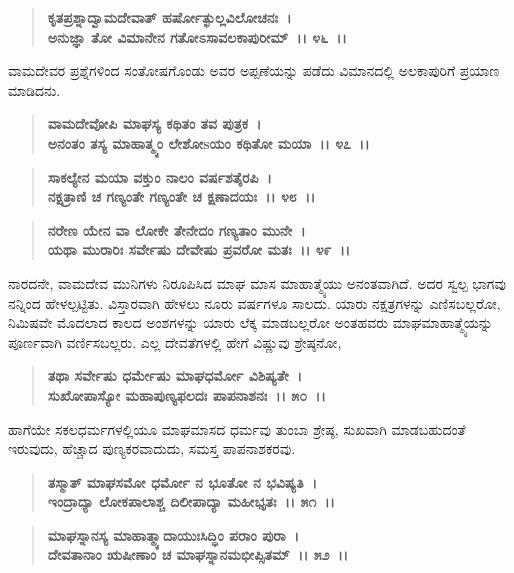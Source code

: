 \begin{verse}
\textbf{ಕೃತಪ್ರಶ್ನಾದ್ವಾಮದೇವಾತ್ ಹರ್ಷೋತ್ಫುಲ್ಲವಿಲೋಚನಃ~।}\\\textbf{ಅನುಜ್ಞಾ ತೋ ವಿಮಾನೇನ ಗತೋಽಸಾವಲಕಾಪುರೀಮ್~।। ೪೬~।।}
\end{verse}

ವಾಮದೇವರ ಪ್ರಶ್ನೆಗಳಿಂದ ಸಂತೋಷಗೊಂಡು ಅವರ ಅಪ್ಪಣೆಯನ್ನು ಪಡೆದು ವಿಮಾನದಲ್ಲಿ ಅಲಕಾಪುರಿಗೆ ಪ್ರಯಾಣ ಮಾಡಿದನು.

\begin{verse}
\textbf{ವಾಮದೇವೋಪಿ ಮಾಘಸ್ಯ ಕಥಿತಂ ತವ ಪುತ್ರಕ~।}\\\textbf{ಅನಂತಂ ತಸ್ಯ ಮಾಹಾತ್ಮ್ಯಂ ಲೇಶೋsಯಂ ಕಥಿತೋ ಮಯಾ~।। ೪೭~।। }
\end{verse}

\begin{verse}
\textbf{ಸಾಕಲ್ಯೇನ ಮಯಾ ವಕ್ತುಂ ನಾಲಂ ವರ್ಷಶತೈರಪಿ~।}\\\textbf{ನಕ್ಷತ್ರಾಣಿ ಚ ಗಣ್ಯಂತೇ ಗಣ್ಯಂತೇ ಚ ಕ್ಷಣಾದಯಃ~।। ೪೮~।।} 
\end{verse}

\begin{verse}
\textbf{ನರೇಣ ಯೇನ ವಾ ಲೋಕೇ ತೇನೇದಂ ಗಣ್ಯತಾಂ ಮುನೇ~।}\\\textbf{ಯಥಾ ಮುರಾರಿಃ ಸರ್ವೇಷು ದೇವೇಷು ಪ್ರವರೋ ಮತಃ~।। ೪೯~।।}
\end{verse}

ನಾರದನೇ, ವಾಮದೇವ ಮುನಿಗಳು ನಿರೂಪಿಸಿದ ಮಾಘ ಮಾಸ ಮಾಹಾತ್ಮ್ಯೆಯು ಅನಂತವಾಗಿದೆ. ಅದರ ಸ್ವಲ್ಪ ಭಾಗವು ನನ್ನಿಂದ ಹೇಳಲ್ಪಟ್ಟಿತು. ವಿಸ್ತಾರವಾಗಿ ಹೇಳಲು ನೂರು ವರ್ಷಗಳೂ ಸಾಲದು. ಯಾರು ನಕ್ಷತ್ರಗಳನ್ನು ಎಣಿಸಬಲ್ಲರೋ, ನಿಮಿಷವೇ ಮೊದಲಾದ ಕಾಲದ ಅಂಶಗಳನ್ನು ಯಾರು ಲೆಕ್ಕ ಮಾಡಬಲ್ಲರೋ ಅಂತಹವರು ಮಾಘಮಾಹಾತ್ಮ್ಯೆಯನ್ನು ಪೂರ್ಣವಾಗಿ ವರ್ಣಿಸಬಲ್ಲರು. ಎಲ್ಲ ದೇವತೆಗಳಲ್ಲಿ ಹೇಗೆ ವಿಷ್ಣುವು ಶ್ರೇಷ್ಠನೋ,

\begin{verse}
\textbf{ತಥಾ ಸರ್ವೇಷು ಧರ್ಮೇಷು ಮಾಘಧರ್ಮೋ ವಿಶಿಷ್ಯತೇ~।}\\\textbf{ಸುಖೋಪಾಸ್ಯೋ ಮಹಾಪುಣ್ಯಫಲದಃ ಪಾಪನಾಶನಃ~।। ೫೦~।।}
\end{verse}

ಹಾಗೆಯೇ ಸಕಲಧರ್ಮಗಳಲ್ಲಿಯೂ ಮಾಘಮಾಸದ ಧರ್ಮವು ತುಂಬಾ ಶ್ರೇಷ್ಠ, ಸುಖವಾಗಿ ಮಾಡಬಹುದಂತೆ ಇರುವುದು, ಹೆಚ್ಚಾದ ಪುಣ್ಯಕರವಾದುದು, ಸಮಸ್ತ ಪಾಪನಾಶಕರವು.

\begin{verse}
\textbf{ತಸ್ಮಾತ್ ಮಾಘಸಮೋ ಧರ್ಮೋ ನ ಭೂತೋ ನ ಭವಿಷ್ಯತಿ~।}\\\textbf{ಇಂದ್ರಾದ್ಯಾ ಲೋಕಪಾಲಾಶ್ಚ ದಿಲೀಪಾದ್ಯಾ ಮಹೀಭೃತಃ~।। ೫೧~।।} 
\end{verse}

\begin{verse}
\textbf{ಮಾಘಸ್ನಾನಸ್ಯ ಮಾಹಾತ್ಮ್ಯಾದಾಯುಃಸಿದ್ಧಿಂ ಪರಾಂ ಪುರಾ~।}\\\textbf{ದೇವತಾನಾಂ ಋಷೀಣಾಂ ಚ ಮಾಘಸ್ನಾನಮಭೀಪ್ಸಿತಮ್~।। ೫೨~।।}
\end{verse}

